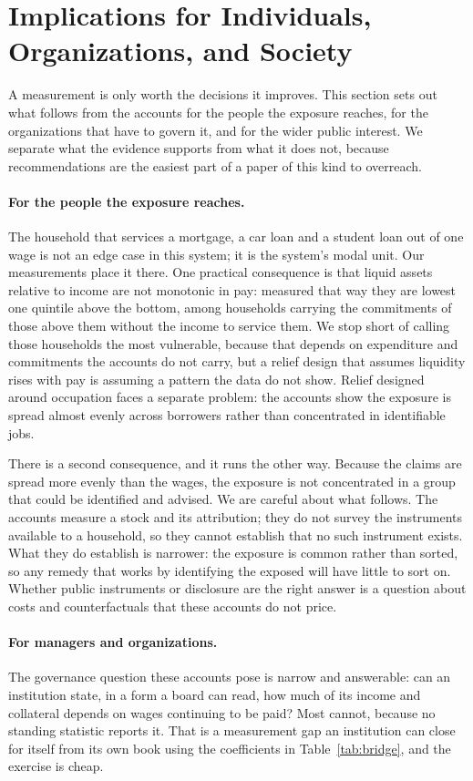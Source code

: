 \section{Implications for Individuals, Organizations, and Society}
\label{sec:implications}

A measurement is only worth the decisions it improves. This section sets out what follows from
the accounts for the people the exposure reaches, for the organizations that have to govern it,
and for the wider public interest. We separate what the evidence supports from what it does not,
because recommendations are the easiest part of a paper of this kind to overreach.

\paragraph{For the people the exposure reaches.} The household that services a mortgage, a car
loan and a student loan out of one wage is not an edge case in this system; it is the system's
modal unit. Our measurements place it there. One practical consequence is that liquid assets
relative to income are not monotonic in pay: measured that way they are lowest one quintile above
the bottom, among households carrying the commitments of those above them without the income to
service them. We stop short of calling those households the most vulnerable, because that
depends on expenditure and commitments the accounts do not carry, but a relief design that
assumes liquidity rises with pay is assuming a pattern the data do not show. Relief designed
around occupation faces a separate problem: the accounts show the exposure is spread almost
evenly across borrowers rather than concentrated in identifiable jobs.

There is a second consequence, and it runs the other way. Because the claims are spread more
evenly than the wages, the exposure is not concentrated in a group that could be identified and
advised. We are careful about what follows. The accounts measure a stock and its attribution;
they do not survey the instruments available to a household, so they cannot establish that no
such instrument exists. What they do establish is narrower: the exposure is common rather than
sorted, so any remedy that works by identifying the exposed will have little to sort on. Whether
public instruments or disclosure are the right answer is a question about costs and
counterfactuals that these accounts do not price.

\paragraph{For managers and organizations.} The governance question these accounts pose is
narrow and answerable: can an institution state, in a form a board can read, how much of its
income and collateral depends on wages continuing to be paid? Most cannot, because no standing
statistic reports it. That is a measurement gap an institution can close for itself from its own
book using the coefficients in Table~\ref{tab:bridge}, and the exercise is cheap.

